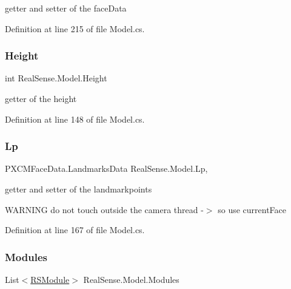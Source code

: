 getter and setter of the face\+Data 

Definition at line 215 of file Model.\+cs.

\mbox{\label{class_real_sense_1_1_model_abf6324c9f4acc3134909a239eff37a0a}} 
\subsubsection{\texorpdfstring{Height}{Height}}
{\footnotesize\ttfamily int Real\+Sense.\+Model.\+Height\hspace{0.3cm}{\ttfamily [get]}}

getter of the height 

Definition at line 148 of file Model.\+cs.

\mbox{\label{class_real_sense_1_1_model_a3e349d000d00015a340954ec3be977ea}} 
\subsubsection{\texorpdfstring{Lp}{Lp}}
{\footnotesize\ttfamily P\+X\+C\+M\+Face\+Data.\+Landmarks\+Data Real\+Sense.\+Model.\+Lp\hspace{0.3cm}{\ttfamily [get]}, {\ttfamily [set]}}

getter and setter of the landmarkpoints

W\+A\+R\+N\+I\+NG do not touch outside the camera thread -\/$>$ so use current\+Face 

Definition at line 167 of file Model.\+cs.

\mbox{\label{class_real_sense_1_1_model_a9664e53331481e9cc45ad6d3540c218c}} 
\subsubsection{\texorpdfstring{Modules}{Modules}}
{\footnotesize\ttfamily List$<$\hyperlink{class_real_sense_1_1_r_s_module}{R\+S\+Module}$>$ Real\+Sense.\+Model.\+Modules\hspace{0.3cm}{\ttfamily [get]}}

